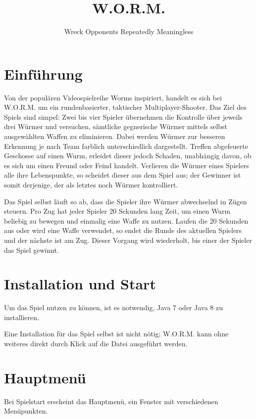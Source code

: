 \documentclass{scrreprt}
\title{W.O.R.M.}
\author{Wreck Opponents Repeatedly Meaningless}
\begin{document}
 
\maketitle
\tableofcontents
\thispagestyle{empty}
\newpage
\setcounter{page}{3}

\chapter{Einführung}
Von der populären Videospielreihe Worms inspiriert, handelt es sich bei W.O.R.M. um ein rundenbasierter, taktischer Multiplayer-Shooter. Das Ziel des Spiels sind simpel:
Zwei bis vier Spieler übernehmen die Kontrolle über jeweils drei Würmer und versuchen, sämtliche gegnerische Würmer mittels selbst ausgewählten Waffen zu eliminieren. Dabei werden Würmer zur besseren Erkennung je nach Team farblich unterschiedlich dargestellt. Treffen abgefeuerte Geschosse auf einen Wurm, erleidet dieser jedoch Schaden, unabhängig davon, ob es sich um einen Freund oder Feind handelt.
Verlieren die Würmer eines Spielers alle ihre Lebenspunkte, so scheidet dieser aus dem Spiel aus; der Gewinner ist somit derjenige, der als letztes noch Würmer kontrolliert.

Das Spiel selbst läuft so ab, dass die Spieler ihre Würmer abwechselnd in Zügen steuern. Pro Zug hat jeder Spieler 20 Sekunden lang Zeit, um einen Wurm beliebig zu bewegen und einmalig eine Waffe zu nutzen. Laufen die 20 Sekunden aus oder wird eine Waffe verwendet, so endet die Runde des aktuellen Spielers und der nächste ist am Zug. Dieser Vorgang wird wiederholt, bis einer der Spieler das Spiel gewinnt.

\chapter{Installation und Start}
Um das Spiel nutzen zu können, ist es notwendig, Java 7 oder Java 8 zu installieren.

Eine Installation für das Spiel selbst ist nicht nötig; W.O.R.M. kann ohne weiteres direkt durch Klick auf die Datei ausgeführt werden.

\chapter{Hauptmenü}
Bei Spielstart erscheint das Hauptmenü, ein Fenster mit verschiedenen Menüpunkten.
\end{document}
